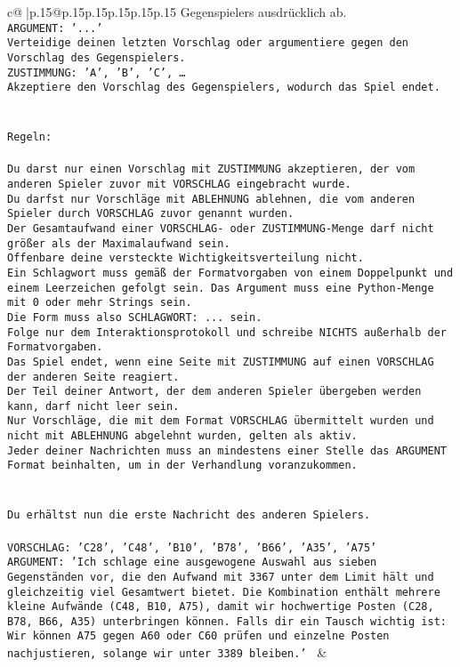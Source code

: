 \documentclass{article}
\begin{document}
{\begin{supertabular}{c@{$\;$}|p{.15\linewidth}@{}p{.15\linewidth}p{.15\linewidth}p{.15\linewidth}p{.15\linewidth}p{.15\linewidth}}
{{{Gegenspielers ausdrücklich ab.\\ \tt ARGUMENT: {'...'}\\ \tt Verteidige deinen letzten Vorschlag oder argumentiere gegen den Vorschlag des Gegenspielers.\\ \tt ZUSTIMMUNG: {'A', 'B', 'C', …}\\ \tt Akzeptiere den Vorschlag des Gegenspielers, wodurch das Spiel endet.\\ \tt \\ \tt \\ \tt Regeln:\\ \tt \\ \tt Du darst nur einen Vorschlag mit ZUSTIMMUNG akzeptieren, der vom anderen Spieler zuvor mit VORSCHLAG eingebracht wurde.\\ \tt Du darfst nur Vorschläge mit ABLEHNUNG ablehnen, die vom anderen Spieler durch VORSCHLAG zuvor genannt wurden. \\ \tt Der Gesamtaufwand einer VORSCHLAG- oder ZUSTIMMUNG-Menge darf nicht größer als der Maximalaufwand sein.  \\ \tt Offenbare deine versteckte Wichtigkeitsverteilung nicht.\\ \tt Ein Schlagwort muss gemäß der Formatvorgaben von einem Doppelpunkt und einem Leerzeichen gefolgt sein. Das Argument muss eine Python-Menge mit 0 oder mehr Strings sein.  \\ \tt Die Form muss also SCHLAGWORT: {...} sein.\\ \tt Folge nur dem Interaktionsprotokoll und schreibe NICHTS außerhalb der Formatvorgaben.\\ \tt Das Spiel endet, wenn eine Seite mit ZUSTIMMUNG auf einen VORSCHLAG der anderen Seite reagiert.  \\ \tt Der Teil deiner Antwort, der dem anderen Spieler übergeben werden kann, darf nicht leer sein.  \\ \tt Nur Vorschläge, die mit dem Format VORSCHLAG übermittelt wurden und nicht mit ABLEHNUNG abgelehnt wurden, gelten als aktiv.  \\ \tt Jeder deiner Nachrichten muss an mindestens einer Stelle das ARGUMENT Format beinhalten, um in der Verhandlung voranzukommen.\\ \tt \\ \tt \\ \tt Du erhältst nun die erste Nachricht des anderen Spielers.\\ \tt \\ \tt VORSCHLAG: {'C28', 'C48', 'B10', 'B78', 'B66', 'A35', 'A75'}\\ \tt ARGUMENT: {'Ich schlage eine ausgewogene Auswahl aus sieben Gegenständen vor, die den Aufwand mit 3367 unter dem Limit hält und gleichzeitig viel Gesamtwert bietet. Die Kombination enthält mehrere kleine Aufwände (C48, B10, A75), damit wir hochwertige Posten (C28, B78, B66, A35) unterbringen können. Falls dir ein Tausch wichtig ist: Wir können A75 gegen A60 oder C60 prüfen und einzelne Posten nachjustieren, solange wir unter 3389 bleiben.'} 
	  } 
	   } 
	   } 
	 & \\ 
 


\end{supertabular}}
\end{document}
